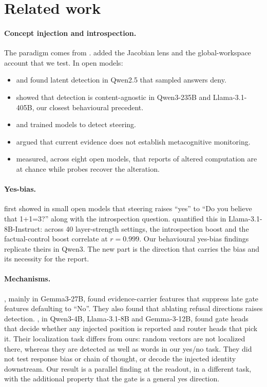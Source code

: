 \documentclass[11pt]{article}
\begin{document}
\section{Related work}\label{sec:related}

\paragraph{Concept injection and introspection.} The paradigm comes from \citet{lindsey2025introspection}. \citet{gurnee2026workspace} added the Jacobian lens and the global-workspace account that we test. In open models:
\begin{itemize}
  \item \citet{vogel2025small} and \citet{pearsonvogel2026latent} found latent detection in Qwen2.5 that sampled answers deny.
  \item \citet{lederman2026content} showed that detection is content-agnostic in Qwen3-235B and Llama-3.1-405B, our closest behavioural precedent.
  \item \citet{rivera2025steering} and \citet{hahami2026ift} trained models to detect steering.
  \item \citet{singh2026reality} argued that current evidence does not establish metacognitive monitoring.
  \item \citet{ferrara2026owmi} measured, across eight open models, that reports of altered computation are at chance while probes recover the alteration.
\end{itemize}

\paragraph{Yes-bias.} \citet{godet2025confusion} first showed in small open models that steering raises ``yes'' to ``Do you believe that 1+1=3?'' along with the introspection question. \citet{hahami2026disturbance} quantified this in Llama-3.1-8B-Instruct: across 40 layer-strength settings, the introspection boost and the factual-control boost correlate at $r=0.999$. Our behavioural yes-bias findings replicate theirs in Qwen3. The new part is the direction that carries the bias and its necessity for the report.

\paragraph{Mechanisms.} \citet{macar2026mechanisms}, mainly in Gemma3-27B, found evidence-carrier features that suppress late gate features defaulting to ``No''. They also found that ablating refusal directions raises detection. \citet{zou2026mechanistic}, in Qwen3-4B, Llama-3.1-8B and Gemma-3-12B, found gate heads that decide whether any injected position is reported and router heads that pick it. Their localization task differs from ours: random vectors are not localized there, whereas they are detected as well as words in our yes/no task. They did not test response bias or chain of thought, or decode the injected identity downstream. Our result is a parallel finding at the readout, in a different task, with the additional property that the gate is a general yes direction.
\end{document}

